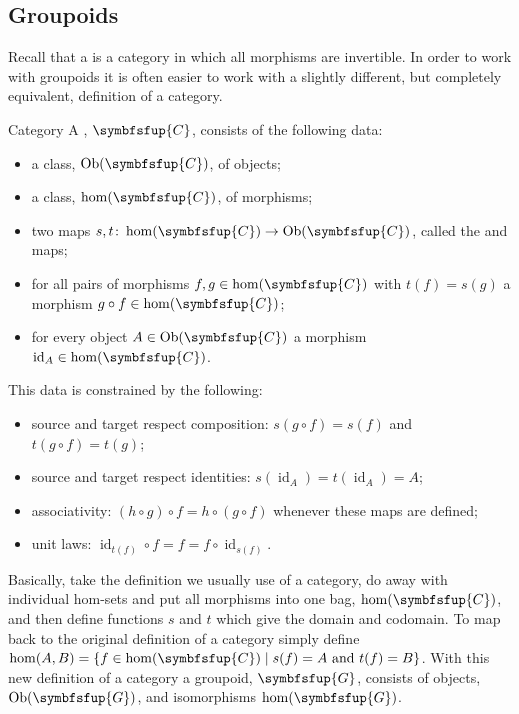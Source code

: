 \documentclass[fleqn]{NotesClass}
\newcommand{\cat}[1]{\symbfsfup{#1}}
\DeclareMathOperator{\Ob}{Ob}
\DeclareMathOperator{\id}{id}
\begin{document}
    \subsection{Groupoids}
    Recall that a  is a category in which all morphisms are invertible.
    In order to work with groupoids it is often easier to work with a slightly different, but completely equivalent, definition of a category.
    \begin{dfn}{Category}{}
        A , \(\cat{C}\), consists of the following data:
        \begin{itemize}
            \item a class, \(\Ob(\cat{C})\), of objects;
            \item a class, \(\hom(\cat{C})\), of morphisms;
            \item two maps \(s, t \colon \hom(\cat{C}) \to \Ob(\cat{C})\), called the  and  maps;
            \item for all pairs of morphisms \(f, g \in \hom(\cat{C})\) with \(t(f) = s(g)\) a morphism \(g \circ f \in \hom(\cat{C})\);
            \item for every object \(A \in \Ob(\cat{C})\) a morphism \(\id_A \in \hom(\cat{C})\).
        \end{itemize}
        This data is constrained by the following:
        \begin{itemize}
            \item source and target respect composition: \(s(g \circ f) = s(f)\) and \(t(g\circ f) = t(g)\);
            \item source and target respect identities: \(s(\id_A) = t(\id_A) = A\);
            \item associativity: \((h \circ g) \circ f = h \circ (g \circ f)\) whenever these maps are defined;
            \item unit laws: \(\id_{t(f)} \circ f = f = f \circ \id_{s(f)}\).
        \end{itemize}
    \end{dfn}
    
    Basically, take the definition we usually use of a category, do away with individual hom-sets and put all morphisms into one bag, \(\hom(\cat{C})\), and then define functions \(s\) and \(t\) which give the domain and codomain.
    To map back to the original definition of a category simply define \(\hom(A, B) = \{f \in \hom(\cat{C}) \mid s(f) = A \text{ and } t(f) = B\}\).
    With this new definition of a category a groupoid, \(\cat{G}\), consists of objects, \(\Ob(\cat{G})\), and isomorphisms \(\hom(\cat{G})\).
    
\end{document}
